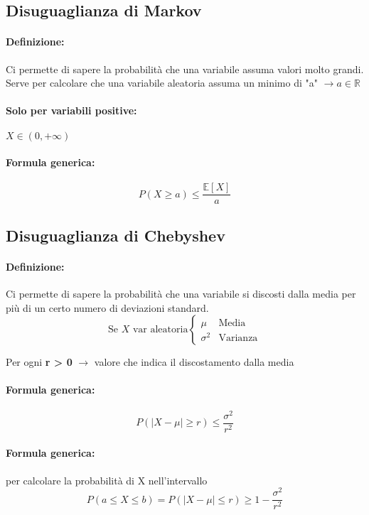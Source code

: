 \documentclass[]{article}
\newcommand{\ev}{\mathbb{E}[X]}
\renewcommand{\ev}[1]{\mathbb{E}[#1]}
\newcommand{\definizione}{\paragraph{Definizione:}}
\newcommand{\formula}{\paragraph{Formula generica:}}
\begin{document}
    \subsection{Disuguaglianza di Markov}
    \definizione Ci permette di sapere la probabilità che una variabile assuma valori molto grandi. \\
    Serve per calcolare che una variabile aleatoria assuma un minimo di "a" $\longrightarrow a \in \mathbb{R}$

    \paragraph{Solo per variabili positive:} $X \in (0, +\infty) $
    \formula \[ P(X \geq a) \leq \frac{\ev{X}}{a}\]
    \subsection{Disuguaglianza di Chebyshev}
    \definizione Ci permette di sapere la probabilità che una variabile si discosti dalla media per più di un certo numero di deviazioni standard.
    \begin{equation*}
        \text{Se } X \text{ var aleatoria}
        \begin{cases}
            \mu & \text{Media} \\
            \sigma^2 & \text{Varianza}
        \end{cases}
    \end{equation*}

    \centerline{Per ogni \textbf{r > 0} $\longrightarrow$ valore che indica il discostamento dalla media}
    \formula 
    \[ P(|X - \mu| \geq r) \leq \frac{\sigma^2}{r^2} \]
    \formula per calcolare la probabilità di X nell'intervallo
    \[ P(a \leq X \leq b) = P(|X - \mu| \leq r) \geq 1 - \frac{\sigma^2}{r^2} \]
\end{document}
